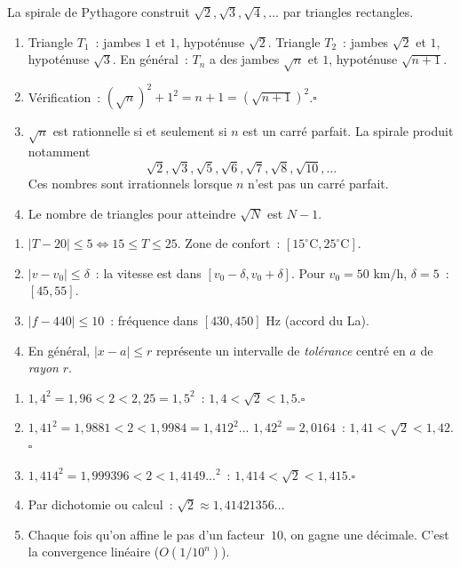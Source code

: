 
La spirale de Pythagore construit $\sqrt{2},\sqrt{3},\sqrt{4},\ldots$ par triangles rectangles.

\begin{enumerate}
  \item Triangle $T_1$~: jambes $1$ et $1$, hypot\'enuse $\sqrt{2}$.
        Triangle $T_2$~: jambes $\sqrt{2}$ et $1$, hypot\'enuse $\sqrt{3}$.
        En g\'en\'eral~: $T_n$ a des jambes $\sqrt{n}$ et $1$, hypot\'enuse $\sqrt{n+1}$.
  \item V\'erification~: $(\sqrt{n})^2+1^2=n+1=(\sqrt{n+1})^2$.\checkmark\hfill$\square$
  \item $\sqrt{n}$ est rationnelle si et seulement si $n$ est un carr\'e parfait.
        La spirale produit notamment
        \[\sqrt{2},\sqrt{3},\sqrt{5},\sqrt{6},\sqrt{7},\sqrt{8},\sqrt{10},\ldots\]
        Ces nombres sont irrationnels lorsque $n$ n'est pas un carr\'e parfait.
  \item Le nombre de triangles pour atteindre $\sqrt{N}$ est $N-1$.
\end{enumerate}


\begin{enumerate}
  \item $|T-20|\leq5\Leftrightarrow15\leq T\leq25$. Zone de confort~: $[15^{\circ}\text{C},25^{\circ}\text{C}]$.
  \item $|v-v_0|\leq\delta$~: la vitesse est dans $[v_0-\delta,v_0+\delta]$.
        Pour $v_0=50\text{ km/h}$, $\delta=5$~: $[45,55]$.
  \item $|f-440|\leq10$~: fr\'equence dans $[430,450]$ Hz (accord du La).
  \item En g\'en\'eral, $|x-a|\leq r$ repr\'esente un intervalle de \emph{tol\'erance}
        centr\'e en $a$ de \emph{rayon} $r$.
\end{enumerate}


\begin{enumerate}
  \item $1{,}4^2=1{,}96<2<2{,}25=1{,}5^2$~: $1{,}4<\sqrt{2}<1{,}5$.\hfill$\square$
  \item $1{,}41^2=1{,}9881<2<1{,}9984=1{,}412^2$... $1{,}42^2=2{,}0164$~:
        $1{,}41<\sqrt{2}<1{,}42$.\hfill$\square$
  \item $1{,}414^2=1{,}999396<2<1{,}4149...^2$~:
        $1{,}414<\sqrt{2}<1{,}415$.\hfill$\square$
  \item Par dichotomie ou calcul~: $\sqrt{2}\approx1{,}41421356\ldots$
  \item Chaque fois qu'on affine le pas d'un facteur~$10$, on gagne une d\'ecimale.
        C'est la convergence lin\'eaire ($O(1/10^n)$).
\end{enumerate}

